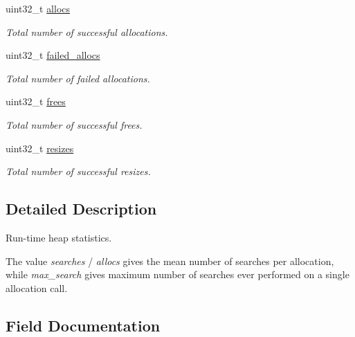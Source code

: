 \begin{DoxyCompactItemize}
uint32\+\_\+t \mbox{\hyperlink{structHeap__Statistics_a7370e24470054dee2c637f7d3ed5a1ca}{allocs}}
\begin{DoxyCompactList}\small\item\em Total number of successful allocations. \end{DoxyCompactList}\item 
\mbox{\label{structHeap__Statistics_a52e07d3937cb370e987dec021f70aa2f}} 
uint32\+\_\+t \mbox{\hyperlink{structHeap__Statistics_a52e07d3937cb370e987dec021f70aa2f}{failed\+\_\+allocs}}
\begin{DoxyCompactList}\small\item\em Total number of failed allocations. \end{DoxyCompactList}\item 
\mbox{\label{structHeap__Statistics_a3a6cbf290c2cc609766294c995e5bcf0}} 
uint32\+\_\+t \mbox{\hyperlink{structHeap__Statistics_a3a6cbf290c2cc609766294c995e5bcf0}{frees}}
\begin{DoxyCompactList}\small\item\em Total number of successful frees. \end{DoxyCompactList}\item 
\mbox{\label{structHeap__Statistics_ada74be71d72577479d02da5df7dcee74}} 
uint32\+\_\+t \mbox{\hyperlink{structHeap__Statistics_ada74be71d72577479d02da5df7dcee74}{resizes}}
\begin{DoxyCompactList}\small\item\em Total number of successful resizes. \end{DoxyCompactList}\end{DoxyCompactItemize}


\subsection{Detailed Description}
Run-\/time heap statistics. 

The value {\itshape searches} / {\itshape allocs} gives the mean number of searches per allocation, while {\itshape max\+\_\+search} gives maximum number of searches ever performed on a single allocation call. 

\subsection{Field Documentation}
\mbox{\label{structHeap__Statistics_ac696ae80238c37378edbfd84d3c5dda7}} 
